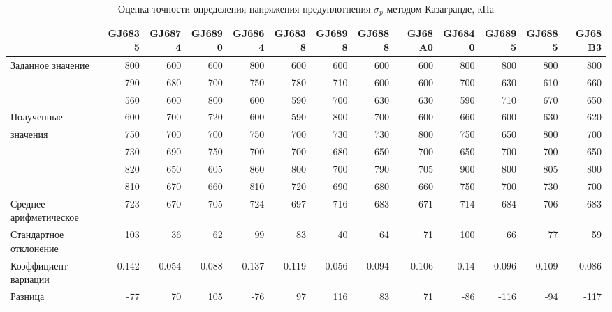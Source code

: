 \begin{sidewaystable}[p]
    \centering
    \small
    \caption{Оценка точности определения напряжения предуплотнения $\sigma_p$ методом Казагранде, кПа} \label{tab:accuracy-caz}
    \begin{tabular}{@{}lrrrrrrrrrrrr@{}}
    \toprule
     & GJ6835 & GJ6874 & GJ6890 & GJ6864 & GJ6838 & GJ6898 & GJ6888 & GJ68A0 & GJ6840 & GJ6895 & GJ6885 & GJ68B3 \\
    \midrule
    Заданное значение & 800 & 600 & 600 & 800 & 600 & 600 & 600 & 600 & 800 & 800 & 800 & 800 \\
    \midrule
     & 790 & 680 & 700 & 750 & 780 & 710 & 600 & 600 & 700 & 630 & 610 & 660 \\
     & 560 & 600 & 800 & 600 & 590 & 700 & 630 & 630 & 590 & 710 & 670 & 650 \\
    Полученные & 600 & 700 & 720 & 600 & 590 & 800 & 700 & 600 & 660 & 600 & 630 & 620 \\
    значения & 750 & 700 & 700 & 750 & 700 & 730 & 730 & 800 & 750 & 650 & 800 & 700 \\
     & 730 & 690 & 750 & 700 & 700 & 680 & 650 & 700 & 650 & 700 & 700 & 650 \\
     & 820 & 650 & 605 & 860 & 800 & 700 & 790 & 705 & 900 & 800 & 805 & 800 \\
     & 810 & 670 & 660 & 810 & 720 & 690 & 680 & 660 & 750 & 700 & 730 & 700 \\
    \midrule
    Среднее арифметическое & 723 & 670 & 705 & 724 & 697 & 716 & 683 & 671 & 714 & 684 & 706 & 683 \\
    Стандартное отклонение & 103 & 36 & 62 & 99 & 83 & 40 & 64 & 71 & 100 & 66 & 77 & 59 \\
    Коэффициент вариации & 0.142 & 0.054 & 0.088 & 0.137 & 0.119 & 0.056 & 0.094 & 0.106 & 0.14 & 0.096 & 0.109 & 0.086 \\
    \midrule
    Разница & -77 & 70 & 105 & -76 & 97 & 116 & 83 & 71 & -86 & -116 & -94 & -117 \\
    \bottomrule
    \end{tabular}
    \\ 
\end{sidewaystable}



